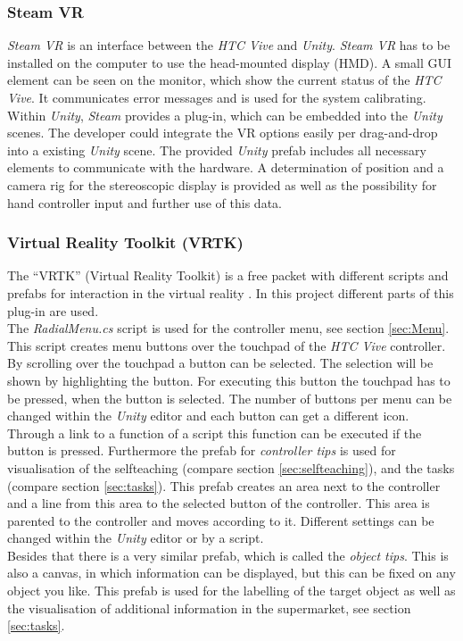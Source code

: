 \subsubsection{Steam VR}
\textit{Steam VR} \cite{website:steamVR} is an interface between the \textit{HTC Vive} and \textit{Unity}. \textit{Steam VR} has to be installed on the computer to use the head-mounted display (HMD). A small GUI element can be seen on the monitor, which show the current status of the \textit{HTC Vive}. It communicates error messages and is used for the system calibrating. \\
Within \textit{Unity}, \textit{Steam} provides a plug-in, which can be embedded into the \textit{Unity} scenes. The developer could integrate the VR options easily per drag-and-drop into a existing \textit{Unity} scene. 
The provided \textit{Unity} prefab includes all necessary elements to communicate with the hardware. A determination of position and a camera rig for the stereoscopic display is provided as well as the possibility for hand controller input and further use of this data.
	
\subsubsection{Virtual Reality Toolkit (VRTK)}\label{sec:VRTK}
The ``VRTK'' (Virtual Reality Toolkit) is a free packet with different scripts and prefabs for interaction in the virtual reality \cite{asset_VRTK} \cite{VRTK}. In this project different parts of this plug-in are used.\\ 
The \textit{RadialMenu.cs} script is used for the controller menu, see section \ref{sec:Menu}. This script creates menu buttons over the touchpad of the \textit{HTC Vive} controller. By scrolling over the touchpad a button can be selected. The selection will be shown by highlighting the button. For executing this button the touchpad has to be pressed, when the button is selected. The number of buttons per menu can be changed within the \textit{Unity} editor and each button can get a different icon. Through a link to a function of a script this function can be executed if the button is pressed.
Furthermore the prefab for \textit{controller tips} is used for visualisation of the selfteaching (compare section \ref{sec:selfteaching}), and the tasks (compare section \ref{sec:tasks}). This prefab creates an area next to the controller and a line from this area to the selected button of the controller. This area is parented to the controller and moves according to it. Different settings can be changed within the \textit{Unity} editor or by a script.\\
Besides that there is a very similar prefab, which is called the \textit{object tips}. This is also a canvas, in which information can be displayed, but this can be fixed on any object you like. This prefab is used for the labelling of the target object as well as the visualisation of additional information in the supermarket, see section \ref{sec:tasks}.

	\newpage
